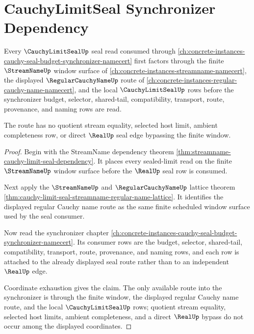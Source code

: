 \section{CauchyLimitSeal Synchronizer Dependency}
\label{sec:cauchy-limit-seal-synchronizer-dependency}

\begin{theorem}
\label{thm:cauchy-limit-seal-streamname-synchronizer-pullback}
Every $\CauchyLimitSealUp$ seal read consumed through \autoref{ch:concrete-instances-cauchy-seal-budget-synchronizer-namecert} first factors through the finite $\StreamNameUp$ window surface of \autoref{ch:concrete-instances-streamname-namecert}, the displayed $\RegularCauchyNameUp$ route of \autoref{ch:concrete-instances-regular-cauchy-name-namecert}, and the local $\CauchyLimitSealUp$ rows before the synchronizer budget, selector, shared-tail, compatibility, transport, route, provenance, and naming rows are read.

The route has no quotient stream equality, selected host limit, ambient completeness row, or direct $\RealUp$ seal edge bypassing the finite window.
\end{theorem}
\begin{proof}
Begin with the StreamName dependency theorem \autoref{thm:streamname-cauchy-limit-seal-dependency}. It places every sealed-limit read on the finite $\StreamNameUp$ window surface before the $\RealUp$ seal row is consumed.

Next apply the $\StreamNameUp$ and $\RegularCauchyNameUp$ lattice theorem \autoref{thm:cauchy-limit-seal-streamname-regular-name-lattice}. It identifies the displayed regular Cauchy name route as the same finite scheduled window surface used by the seal consumer.

Now read the synchronizer chapter \autoref{ch:concrete-instances-cauchy-seal-budget-synchronizer-namecert}. Its consumer rows are the budget, selector, shared-tail, compatibility, transport, route, provenance, and naming rows, and each row is attached to the already displayed seal route rather than to an independent $\RealUp$ edge.

Coordinate exhaustion gives the claim. The only available route into the synchronizer is through the finite window, the displayed regular Cauchy name route, and the local $\CauchyLimitSealUp$ rows; quotient stream equality, selected host limits, ambient completeness, and a direct $\RealUp$ bypass do not occur among the displayed coordinates.
\end{proof}

